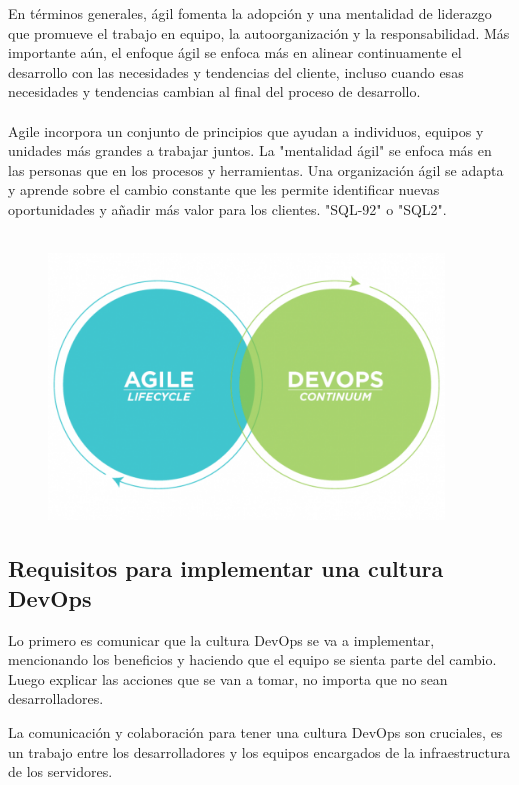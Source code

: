 \documentclass[preprint,12pt]{elsarticle}
\begin{document}
En términos generales, ágil fomenta la adopción y una mentalidad de liderazgo que promueve el trabajo en equipo, la autoorganización y la responsabilidad. Más importante aún, el enfoque ágil se enfoca más en alinear continuamente el desarrollo con las necesidades y tendencias del cliente, incluso cuando esas necesidades y tendencias cambian al final del proceso de desarrollo.
\\
\\
Agile incorpora un conjunto de principios que ayudan a individuos, equipos y unidades más grandes a trabajar juntos. La "mentalidad ágil" se enfoca más en las personas que en los procesos y herramientas. Una organización ágil se adapta y aprende sobre el cambio constante que les permite identificar nuevas oportunidades y añadir más valor para los clientes. "SQL-92" o "SQL2".\cite{referenciarobles1}
\\
\\

\begin{figure}[htb]
				\begin{center}
					\includegraphics[width=10.5cm]{./IMAGENES/evolucion}
				\end{center}
			\end{figure}


\subsection{Requisitos para implementar una cultura DevOps}
Lo primero es comunicar que la cultura DevOps se va a implementar, mencionando los beneficios y haciendo que el equipo se sienta parte del cambio. Luego explicar las acciones que se van a tomar, no importa que no sean desarrolladores.

La comunicación y colaboración para tener una cultura DevOps son cruciales, es un trabajo entre los desarrolladores y los equipos encargados de la infraestructura de los servidores.
\end{document}
